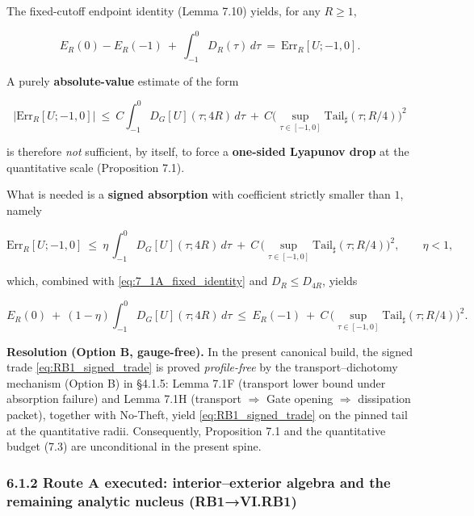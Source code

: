 \documentclass[
  11pt,
]{article}
\begin{document}
The fixed-cutoff endpoint identity (Lemma 7.10) yields, for any \(R\ge 1\),

\begin{equation}
E_R(0)-E_R(-1)\ +\ \int_{-1}^{0}D_R(\tau)\,d\tau\ =\ \mathrm{Err}_R[U;-1,0].
\tag{7.1A}\label{eq:7_1A_fixed_identity}
\end{equation}

A purely \textbf{absolute-value} estimate of the form

\begin{equation}
|\mathrm{Err}_R[U;-1,0]|
\ \le\ C\int_{-1}^{0}D_G[U](\tau;4R)\,d\tau\ +\ C\Big(\sup_{\tau\in[-1,0]}\mathrm{Tail}_\sharp(\tau;R/4)\Big)^2
\tag{7.20C revisited}
\end{equation}

is therefore \emph{not} sufficient, by itself, to force a \textbf{one-sided Lyapunov drop} at the quantitative scale (Proposition 7.1).

What is needed is a \textbf{signed absorption} with coefficient strictly smaller than \(1\), namely

\begin{equation}
\mathrm{Err}_R[U;-1,0]
\ \le\ \eta\,\int_{-1}^{0}D_G[U](\tau;4R)\,d\tau
\ +\ C\,\Big(\sup_{\tau\in[-1,0]}\mathrm{Tail}_\sharp(\tau;R/4)\Big)^2,
\qquad \eta<1,
\tag{RB1}\label{eq:RB1_signed_trade}
\end{equation}

which, combined with \eqref{eq:7_1A_fixed_identity} and \(D_R\le D_{4R}\), yields

\begin{equation}
E_R(0)\ +\ (1-\eta)\int_{-1}^{0}D_G[U](\tau;4R)\,d\tau
\ \le\ E_R(-1)\ +\ C\,\Big(\sup_{\tau\in[-1,0]}\mathrm{Tail}_\sharp(\tau;R/4)\Big)^2.
\tag{7.1B}\label{eq:7_1B_signed_drop}
\end{equation}

\textbf{Resolution (Option B, gauge-free).} In the present canonical build, the signed trade \eqref{eq:RB1_signed_trade} is proved \emph{profile-free} by the transport--dichotomy mechanism (Option B) in §4.1.5: Lemma 7.1F (transport lower bound under absorption failure) and Lemma 7.1H (transport \(\Rightarrow\) Gate opening \(\Rightarrow\) dissipation packet), together with No-Theft, yield \eqref{eq:RB1_signed_trade} on the pinned tail at the quantitative radii. Consequently, Proposition 7.1 and the quantitative budget (7.3) are unconditional in the present spine.

\hypertarget{route-a-executed-interiorexterior-algebra-and-the-remaining-analytic-nucleus-rb1vi.rb1}{%
\subsubsection{6.1.2 Route A executed: interior--exterior algebra and the remaining analytic nucleus (RB1→VI.RB1)}\label{route-a-executed-interiorexterior-algebra-and-the-remaining-analytic-nucleus-rb1vi.rb1}}
\end{document}
